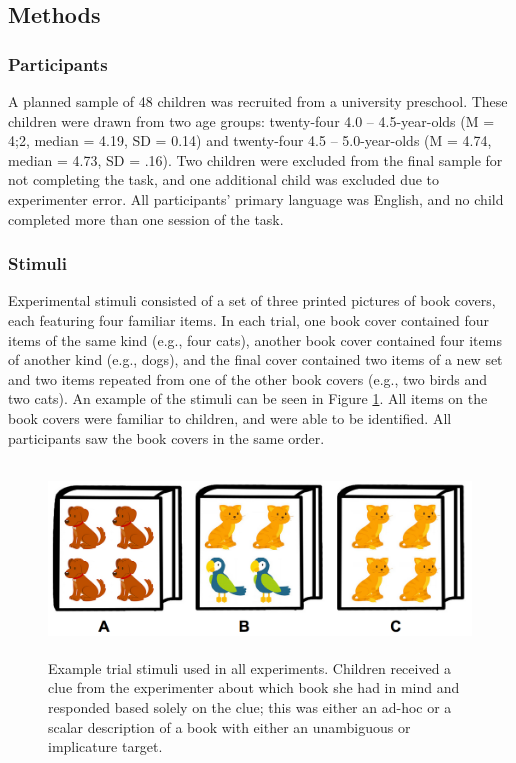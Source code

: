 \documentclass[man]{apa2}
\begin{document}

\subsection{Methods}

\subsubsection{Participants} A planned sample of 48 children was recruited from a university preschool. These children were drawn from two age groups: twenty-four 4.0 -- 4.5-year-olds (M = 4;2, median = 4.19, SD = 0.14) and twenty-four 4.5 -- 5.0-year-olds (M = 4.74, median = 4.73, SD = .16). Two children were excluded from the final sample for not completing the task, and one additional child was excluded due to experimenter error. All participants' primary language was English, and no child completed more than one session of the task. 

\subsubsection{Stimuli}
Experimental stimuli consisted of a set of three printed pictures of book covers, each featuring four familiar items. In each trial, one book cover contained four items of the same kind (e.g., four cats), another book cover contained four items of another kind (e.g., dogs), and the final cover contained two items of a new set and two items repeated from one of the other book covers (e.g., two birds and two cats). An example of the stimuli can be seen in Figure \ref{fig:demo}. All items on the book covers were familiar to children, and were able to be identified. All participants saw the book covers in the same order. 

\begin{figure}
 \begin{center} 
  \includegraphics[height=2in]{figures/implicatures_demo_letters.png}
  \caption{\label{fig:demo} Example trial stimuli used in all experiments. Children received a clue from the experimenter about which book she had in mind and responded based solely on the clue; this was either an ad-hoc or a scalar description of a book with either an unambiguous or implicature target.} 
 \end{center} 
\end{figure}
\end{document}
